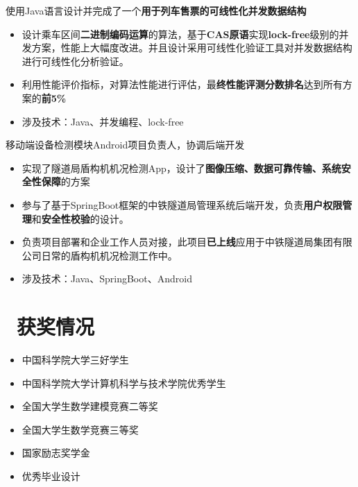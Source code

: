 \documentclass{resume}
\begin{document}
\begin{onehalfspacing}
  使用Java语言设计并完成了一个\textbf{用于列车售票的可线性化并发数据结构}
\begin{itemize}
  \item 设计乘车区间\textbf{二进制编码运算}的算法，基于\textbf{CAS原语}实现\textbf{lock-free}级别的并发方案，性能上大幅度改进。并且设计采用可线性化验证工具对并发数据结构进行可线性化分析验证。
  \item 利用性能评价指标，对算法性能进行评估，最\textbf{终性能评测分数排名}达到所有方案的\textbf{前5\%}
  \item 涉及技术：Java、并发编程、lock-free
\end{itemize}
\end{onehalfspacing}

\begin{onehalfspacing}
移动端设备检测模块Android项目负责人，协调后端开发
\begin{itemize}
  \item 实现了隧道局盾构机机况检测App，设计了\textbf{图像压缩、数据可靠传输、系统安全性保障}的方案
  \item 参与了基于SpringBoot框架的中铁隧道局管理系统后端开发，负责\textbf{用户权限管理}和\textbf{安全性校验}的设计。
  \item 负责项目部署和企业工作人员对接，此项目\textbf{已上线}应用于中铁隧道局集团有限公司日常的盾构机机况检测工作中。
  \item 涉及技术：Java、SpringBoot、Android
\end{itemize}
\end{onehalfspacing}


\section{\faHeartO\ 获奖情况}
\begin{itemize}[parsep=0.5ex]
  \item 中国科学院大学三好学生
  \item 中国科学院大学计算机科学与技术学院优秀学生
  \item 全国大学生数学建模竞赛二等奖
  \item 全国大学生数学竞赛三等奖
  \item 国家励志奖学金
  \item 优秀毕业设计
\end{itemize}
\end{document}
